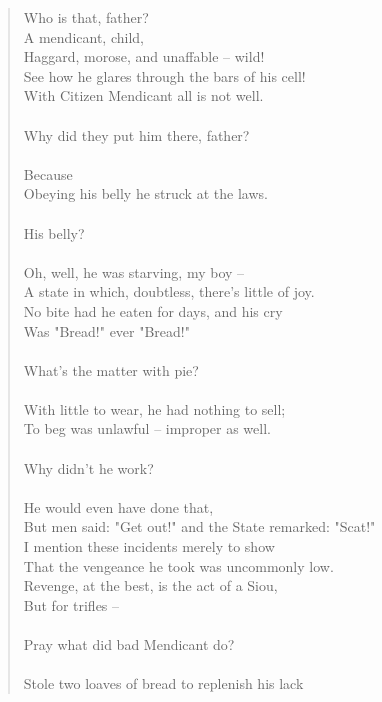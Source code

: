 \documentclass[11pt]{article}
\begin{document}
\begin{quote}   Who is that, father? \\
                        A mendicant, child, \\
  Haggard, morose, and unaffable -- wild! \\
  See how he glares through the bars of his cell! \\
  With Citizen Mendicant all is not well. \\
 \\
  Why did they put him there, father? \\
 \\
                                       Because \\
  Obeying his belly he struck at the laws. \\
 \\
  His belly? \\
 \\
              Oh, well, he was starving, my boy -- \\
  A state in which, doubtless, there's little of joy. \\
  No bite had he eaten for days, and his cry \\
  Was "Bread!" ever "Bread!" \\
 \\
                              What's the matter with pie? \\
 \\
  With little to wear, he had nothing to sell; \\
  To beg was unlawful -- improper as well. \\
 \\
  Why didn't he work? \\
 \\
                       He would even have done that, \\
  But men said:  "Get out!" and the State remarked:  "Scat!" \\
  I mention these incidents merely to show \\
  That the vengeance he took was uncommonly low. \\
  Revenge, at the best, is the act of a Siou, \\
  But for trifles -- \\
 \\
                      Pray what did bad Mendicant do? \\
 \\
  Stole two loaves of bread to replenish his lack \\

\end{quote}
\end{document}
